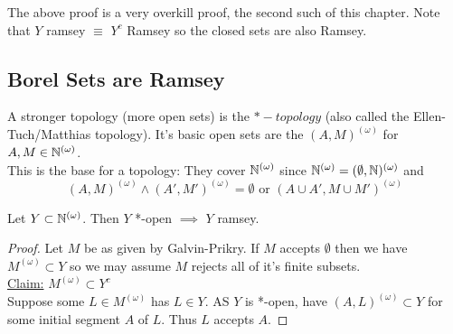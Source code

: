 \documentclass[a4paper]{article}
\newcommand{\Nomega}{\N^{(\omega)}}
\newcommand{\Momega}{M^{(\omega)}}
\begin{document}
  The above proof is a very overkill proof, the second such of this chapter.
  Note that $Y$ ramsey $\equiv$ $Y^c$ Ramsey so the closed sets are also Ramsey.
  \subsection{Borel Sets are Ramsey}
  A stronger topology (more open sets) is the $*-topology$ (also called the
  Ellen-Tuch/Matthias topology). It's basic open sets are the $(A,
  M)^{(\omega)}$ for $A,M \in \Nomega$.\\
  This is the base for a topology: They cover $\Nomega$ since $\Nomega =
  (\emptyset, \N)^{(\omega)}$ and
  \[(A, M)^{(\omega)} \wedge (A', M')^{(\omega)} = \emptyset \text{ or } (A \cup
    A', M \cup M')^{(\omega)}\]
  \begin{thm}
    Let $Y \subset \Nomega$. Then $Y$ *-open $\implies$ $Y$ ramsey.
  \end{thm}
  \begin{proof}
    Let $M$ be as given by Galvin-Prikry. If $M$ accepts $\emptyset$ then we
    have $\Momega \subset Y$ so we may assume $M$ rejects all of it's finite
    subsets.\\
    \underline{Claim:} $\Momega \subset Y^c$\\
    Suppose some $L \in \Momega$ has $L \in Y$. AS $Y$ is *-open, have
    $(A,L)^{(\omega)} \subset Y$ for some initial segment $A$ of $L$. Thus $L$
    accepts $A$.
    \end{proof}
  \printindex
\end{document}
